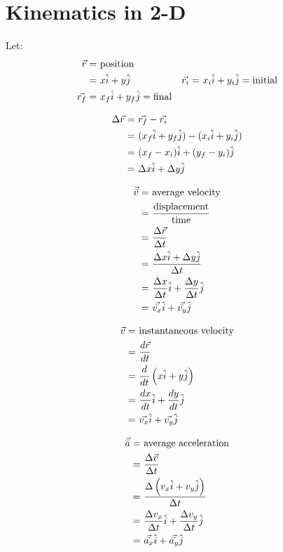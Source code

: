 \section{Kinematics in 2-D}
	Let:
	\begin{align}
		\vec{r} = \ &\text{position}& \notag \\
		= \ &x\hat{i} + y\hat{j}& \notag
		\vec{r_{i}} = \ &x_{i}\hat{i} + y_{i}\hat{j} = \text{initial}& \notag \\
		\vec{r_{f}} = \ &x_{f}\hat{i} + y_{f}\hat{j} = \text{final}& \notag
	\end{align}


	\begin{align}
		\Delta \vec{r} = \ &\vec{r_{f}} - \vec{r_{i}}& \notag \\
		= \ &(x_{f}\hat{i} + y_{f}\hat{j}) - (x_{i}\hat{i} + y_{i}\hat{j})& \notag \\
		= \ &(x_{f} - x_{i})\hat{i} + (y_{f} - y_{i})\hat{j}& \notag \\
		= \ &\Delta x \hat{i} + \Delta y \hat{j}& \notag
	\end{align}

	\begin{align}
		\vec{\bar{v}} = \ &\text{average velocity}& \notag \\
		= \ &\frac{\text{displacement}}{\text{time}}& \notag \\
		= \ &\frac{\Delta \vec{r}}{\Delta t}& \notag \\
		= \ &\frac{\Delta x \hat{i} + \Delta y \hat{j}}{\Delta t}& \notag \\
		= \ &\frac{\Delta x}{\Delta t}\hat{i} + \frac{\Delta y}{\Delta t}\hat{j}& \notag \\
		= \ &\vec{\bar{v_{x}}}\hat{i} + \vec{\bar{v_{y}}}\hat{j}& \notag
	\end{align}

	\begin{align}
		\vec{v} = \ &\text{instantaneous velocity}& \notag \\
		= \ &\frac{d \vec{r}}{dt}& \notag \\
		= \ &\frac{d}{dt} \left( x \hat{i} + y \hat{j} \right)& \notag \\
		= \ &\frac{dx}{dt}\hat{i} + \frac{dy}{dt}\hat{j}& \notag \\
		= \ &\vec{v_{x}}\hat{i} + \vec{v_{y}}\hat{j}& \notag
	\end{align}

	\begin{align}
		\vec{\bar{a}} = \ &\text{average acceleration}& \notag \\
		= \ &\frac{\Delta \vec{v}}{\Delta t}& \notag \\
		= \ &\frac{\Delta \left( v_{x} \hat{i} + v_{y} \hat{j} \right)}{\Delta t}& \notag \\
		= \ &\frac{\Delta v_{x}}{\Delta t}\hat{i} + \frac{\Delta v_{y}}{\Delta t}\hat{j}& \notag \\
		= \ &\vec{\bar{a_{x}}}\hat{i} + \vec{\bar{a_{y}}}\hat{j}& \notag
	\end{align}

